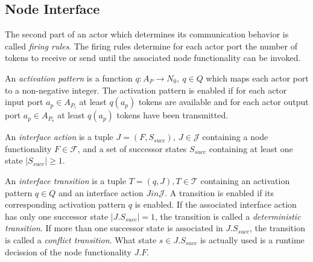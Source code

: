 \subsection{Node Interface}\label{node-interface}

The second part of an actor which determines its communication
behavior is called \emph{firing rules}. The firing rules
determine for each actor port the number of tokens to receive or send
until the associated node functionality can be invoked.


\begin{definition}\label{activation-pattern}
An \emph{activation pattern} is a function $q: A_{P} \to N_0,\ q \in Q$
which maps each actor port to a non-negative integer.
The activation pattern is enabled if for each actor input port
$a_{p} \in A_{P_{i}}$ at least $q(a_{p})$ tokens are available
and for each actor output port
$a_{p} \in A_{P_{o}}$ at least $q(a_{p})$ tokens have been
transmitted.
\end{definition}

\begin{definition}\label{interface-action}
An \emph{interface action} is a tuple $J = (F,S_{succ}),\ J \in \mathcal{J}$ containing
a node functionality $F \in \mathcal{F}$, and a set of successor states $S_{succ}$ containing at least
one state $|S_{succ}| \ge 1$.
\end{definition}

\begin{definition}\label{interface-transition}
An \emph{interface transition} is a tuple $T = (q,J), T \in \mathcal{T}$ containing
an activation pattern $q \in Q$ and an interface action $J in \mathcal{J}$.
A transition is enabled if its corresponding activation pattern $q$ is enabled.
If the associated interface action has only one successor state $|J.S_{succ}| = 1$, the
transition is called a \emph{deterministic transition}.
If more than one successor state is associated in $J.S_{succ}$, the
transition is called a \emph{conflict transition}. What state $s \in J.S_{succ}$
is actually used is a runtime decission of the node functionality $J.F$.
\end{definition}

